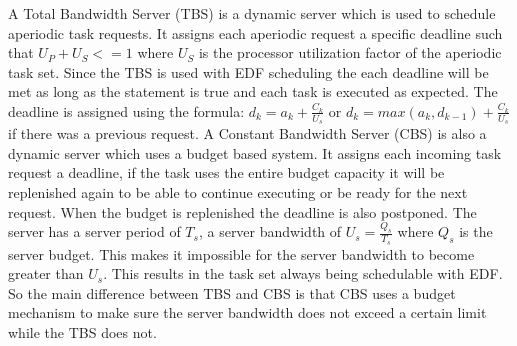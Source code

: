         A Total Bandwidth Server (TBS) is a dynamic server which is used to schedule aperiodic task requests. It assigns each aperiodic request a specific deadline such that $U_P + U_S <= 1$ where $U_S$ is the processor utilization factor of the aperiodic task set. Since the TBS is used with EDF scheduling the each deadline will be met as long as the statement is true and each task is executed as expected. The deadline is assigned using the formula: $d_k = a_k + \frac{C_k}{U_s}$ or $d_k = max(a_k, d_{k-1}) + \frac{C_k}{U_s}$ if there was a previous request. A Constant Bandwidth Server (CBS) is also a dynamic server which uses a budget based system. It assigns each incoming task request a deadline, if the task uses the entire budget capacity it will be replenished again to be able to continue executing or be ready for the next request. When the budget is replenished the deadline is also postponed. The server has a server period of $T_s$, a server bandwidth of $U_s = \frac{Q_s}{T_s}$ where $Q_s$ is the server budget. This makes it impossible for the server bandwidth to become greater than $U_s$. This results in the task set always being schedulable with EDF. So the main difference between TBS and CBS is that CBS uses a budget mechanism to make sure the server bandwidth does not exceed a certain limit while the TBS does not.\\



        